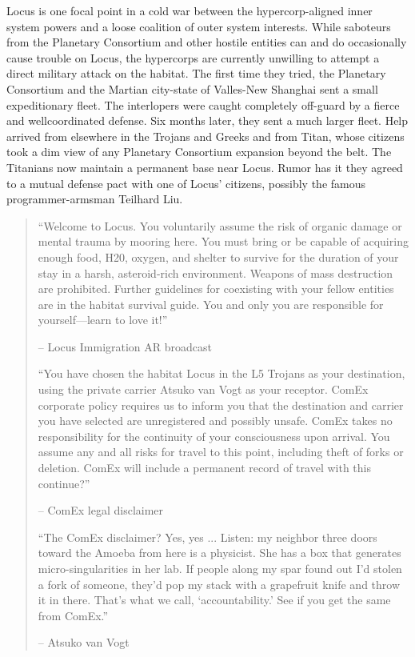 Locus is one focal point in a cold war between the hypercorp-aligned inner system powers and a loose coalition of outer system interests. While saboteurs from the Planetary Consortium and other hostile entities can and do occasionally cause trouble on Locus, the hypercorps are currently unwilling to attempt a direct military attack on the habitat. The first time they tried, the Planetary Consortium and the Martian city-state of Valles-New Shanghai sent a small expeditionary fleet. The interlopers were caught completely off-guard by a fierce and wellcoordinated defense. Six months later, they sent a much larger fleet. Help arrived from elsewhere in the Trojans and Greeks and from Titan, whose citizens took a dim view of any Planetary Consortium expansion beyond the belt. The Titanians now maintain a permanent base near Locus. Rumor has it they agreed to a mutual defense pact with one of Locus' citizens, possibly the famous programmer-armsman Teilhard Liu. 

\begin{quotation} “Welcome to Locus. You voluntarily assume the risk of organic damage or mental trauma by mooring here. You must bring or be capable of acquiring enough food, H20, oxygen, and shelter to survive for the duration of your stay in a harsh, asteroid-rich environment. Weapons of mass destruction are prohibited. Further guidelines for coexisting with your fellow entities are in the habitat survival guide. You and only you are responsible for yourself—learn to love it!” 

-- Locus Immigration AR broadcast 

“You have chosen the habitat Locus in the L5 Trojans as your destination, using the private carrier Atsuko van Vogt as your receptor. ComEx corporate policy requires us to inform you that the destination and carrier you have selected are unregistered and possibly unsafe. ComEx takes no responsibility for the continuity of your consciousness upon arrival. You assume any and all risks for travel to this point, including theft of forks or deletion. ComEx will include a permanent record of travel with this continue?” 

-- ComEx legal disclaimer 

“The ComEx disclaimer? Yes, yes ... Listen: my neighbor three doors toward the Amoeba from here is a physicist. She has a box that generates micro-singularities in her lab. If people along my spar found out I’d stolen a fork of someone, they’d pop my stack with a grapefruit knife and throw it in there. That’s what we call, ‘accountability.’ See if you get the same from ComEx.” 

-- Atsuko van Vogt \end{quotation} 

